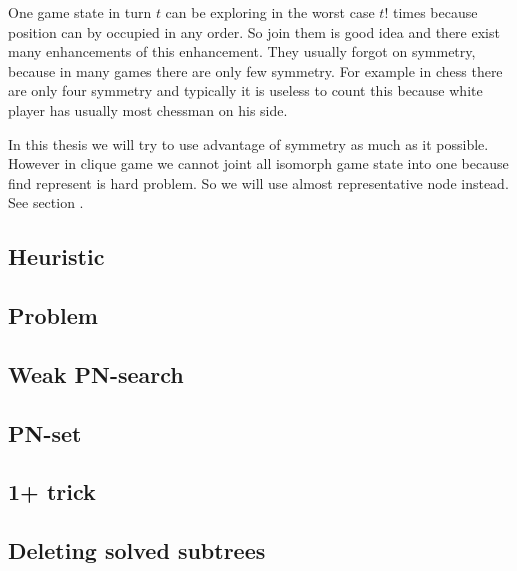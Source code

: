 One game state in turn $t$ can be exploring in the worst case $t!$ times
because position can by occupied in any order. So join them is good idea and
there exist many enhancements of this enhancement. They usually forgot on
symmetry, because in many games there are only few symmetry. For example in
chess there are only four symmetry and typically it is useless to count this
because white player has usually most chessman on his side. 

In this thesis we will try to use advantage of symmetry as much as it possible. However in clique
game we cannot joint all isomorph game state into one because find represent is hard problem.
So we will use almost representative node instead. See section .

\subsection{Heuristic}

\subsection{Problem  }

\subsection{Weak PN-search}

\subsection{PN-set}

\subsection{1+ trick}


\subsection{Deleting solved subtrees}


